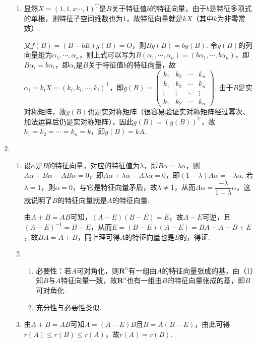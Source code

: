 \begin{enumerate}
\begin{enumerate}
        \item 显然$X=(1,1,x\cdots,1)^\mathrm{T}$是$B$关于特征值$b$的特征向量，由于$b$是特征多项式的单根，则特征子空间维数也为1，故特征向量就是$kX$（其中$k$为非零常数）.

        又$f(B)=(B-bE)g(B)=O$，则$Bg(B)=bg(B)$. 令$g(B)$的列向量组为$\alpha_1,\cdots,\alpha_n$，则上式可以写为$B(\alpha_1,\cdots,\alpha_n)=(b\alpha_1,\cdots,b\alpha_n)$，即$B\alpha_i=b\alpha_i$，即$\alpha_i$是$B$关于特征值$b$的特征向量，故$\alpha_i=k_iX=(k_i,k_i,\cdots,k_i)^{\mathrm{T}}$，即$g(B)=\begin{pmatrix}
            k_1 & k_2 & \cdots & k_n \\ k_1 & k_2 & \cdots & k_n \\ \vdots & \vdots & \ddots & \vdots \\ k_1 & k_2 & \cdots & k_n
        \end{pmatrix}$. 由于$B$是实对称矩阵，故$g(B)$也是实对称矩阵（很容易验证实对称矩阵经过幂次、加法运算后仍是实对称矩阵），因此$g(B)=(g(B))^\mathrm{T}$，故$k_1=k_2=\cdots=k_n=k$，即$g(B)=kA$.
    \end{enumerate}

    \item \begin{enumerate}
        \item 设$\alpha$是$B$的特征向量，对应的特征值为$\lambda$，即$B\alpha=\lambda\alpha$，则$A\alpha+B\alpha-AB\alpha=0$，即$A\alpha+\lambda\alpha-A\lambda\alpha=0$，即$(1-\lambda)A\alpha=-\lambda\alpha$. 若$\lambda=1$，则$\alpha=0$，与它是特征向量矛盾，故$\lambda\neq 1$，从而$A\alpha=\dfrac{-\lambda}{1-\lambda}\alpha$，这就说明了$B$的特征向量就是$A$的特征向量.

        由$A+B=AB$可知，$(A-E)(B-E)=E$，故$A-E$可逆，且$(A-E)^{-1}=B-E$，从而$E=(B-E)(A-E)=BA-A-B+E$，故$BA=A+B$，同上理可得$A$的特征向量也是$B$的，得证.

        \item \begin{enumerate}
            \item 必要性：若$A$可对角化，则$\mathbf{R}^n$有一组由$A$的特征向量张成的基，由（1）知$B$与$A$特征向量一致，故$\mathbf{R}^n$也有一组由$B$的特征向量张成的基，即$B$可对角化.
            \item 充分性与必要性类似.
        \end{enumerate}

        \item 由$A+B=AB$可知$A=(A-E)B$且$B=A(B-E)$，由此可得$r(A)\leqslant r(B)\leqslant r(A)$，故$r(A)=r(B)$.
    \end{enumerate}


\end{enumerate}
